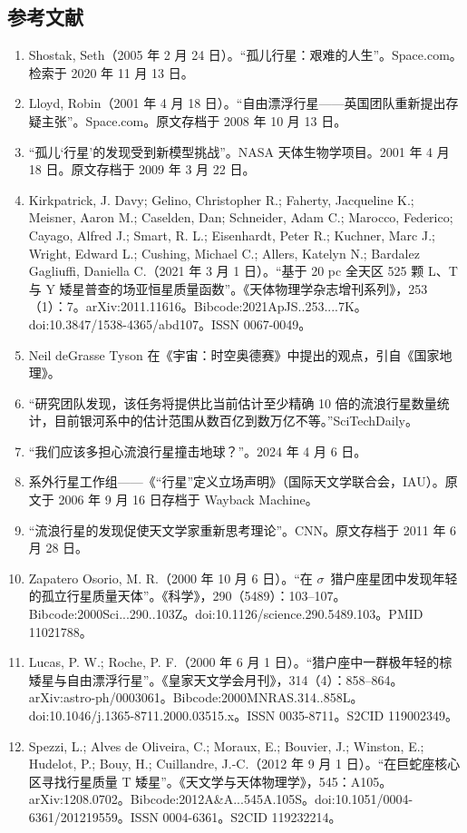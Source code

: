 \subsection{参考文献}
\begin{enumerate}
\item Shostak, Seth（2005 年 2 月 24 日）。“孤儿行星：艰难的人生”。Space.com。检索于 2020 年 11 月 13 日。  
\item Lloyd, Robin（2001 年 4 月 18 日）。“自由漂浮行星——英国团队重新提出存疑主张”。Space.com。原文存档于 2008 年 10 月 13 日。  
\item “孤儿‘行星’的发现受到新模型挑战”。NASA 天体生物学项目。2001 年 4 月 18 日。原文存档于 2009 年 3 月 22 日。  
\item Kirkpatrick, J. Davy; Gelino, Christopher R.; Faherty, Jacqueline K.; Meisner, Aaron M.; Caselden, Dan; Schneider, Adam C.; Marocco, Federico; Cayago, Alfred J.; Smart, R. L.; Eisenhardt, Peter R.; Kuchner, Marc J.; Wright, Edward L.; Cushing, Michael C.; Allers, Katelyn N.; Bardalez Gagliuffi, Daniella C.（2021 年 3 月 1 日）。“基于 20 pc 全天区 525 颗 L、T 与 Y 矮星普查的场亚恒星质量函数”。《天体物理学杂志增刊系列》，253（1）：7。arXiv:2011.11616。Bibcode:2021ApJS..253....7K。doi:10.3847/1538-4365/abd107。ISSN 0067-0049。  
\item Neil deGrasse Tyson 在《宇宙：时空奥德赛》中提出的观点，引自《国家地理》。  
\item “研究团队发现，该任务将提供比当前估计至少精确 10 倍的流浪行星数量统计，目前银河系中的估计范围从数百亿到数万亿不等。”SciTechDaily。  
\item “我们应该多担心流浪行星撞击地球？”。2024 年 4 月 6 日。  
\item 系外行星工作组——《“行星”定义立场声明》（国际天文学联合会，IAU）。原文于 2006 年 9 月 16 日存档于 Wayback Machine。  
\item “流浪行星的发现促使天文学家重新思考理论”。CNN。原文存档于 2011 年 6 月 28 日。  
\item Zapatero Osorio, M. R.（2000 年 10 月 6 日）。“在 $\sigma$~猎户座星团中发现年轻的孤立行星质量天体”。《科学》，290（5489）：103--107。Bibcode:2000Sci...290..103Z。doi:10.1126/science.290.5489.103。PMID 11021788。  
\item Lucas, P. W.; Roche, P. F.（2000 年 6 月 1 日）。“猎户座中一群极年轻的棕矮星与自由漂浮行星”。《皇家天文学会月刊》，314（4）：858--864。arXiv:astro-ph/0003061。Bibcode:2000MNRAS.314..858L。doi:10.1046/j.1365-8711.2000.03515.x。ISSN 0035-8711。S2CID 119002349。  
\item Spezzi, L.; Alves de Oliveira, C.; Moraux, E.; Bouvier, J.; Winston, E.; Hudelot, P.; Bouy, H.; Cuillandre, J.-C.（2012 年 9 月 1 日）。“在巨蛇座核心区寻找行星质量 T 矮星”。《天文学与天体物理学》，545：A105。arXiv:1208.0702。Bibcode:2012A\&A...545A.105S。doi:10.1051/0004-6361/201219559。ISSN 0004-6361。S2CID 119232214。  

\end{enumerate}
